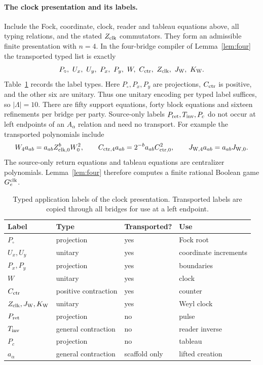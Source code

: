 \paragraph{The clock presentation and its labels.}
Include the Fock, coordinate, clock, reader and tableau equations above, all typing relations, and the stated $Z_{\rm clk}$ commutators. They form an admissible finite presentation with $n=4$. In the four-bridge compiler of Lemma~\ref{lem:four} the transported typed list is exactly
\begin{equation}\label{eq:labelset}
 P_{\circ},\ U_x,\ U_y,\ P_x,\ P_y,\ W,\ C_{\rm ctr},\ Z_{\rm clk},\ J_{\rm W},\ K_{\rm W}.
\end{equation}
Table~\ref{tab:labels} records the label types. Here $P_{\circ},P_x,P_y$ are projections, $C_{\rm ctr}$ is positive, and the other six are unitary. Thus one unitary encoding per typed label suffices, so $|\Lambda|=10$. There are fifty support equations, forty block equations and sixteen refinements per bridge per party. Source-only labels $P_{\rm ret},T_{\rm inv},P_c$ do not occur at left endpoints of an $A_\alpha$ relation and need no transport. For example the transported polynomials include
\[
 W_4a_{ab}=a_{ab}Z_{{\rm clk},0}^bW_0^2,\qquad
 C_{{\rm ctr},4}a_{ab}=2^{-b}a_{ab}C_{{\rm ctr},0}^2,\qquad
 J_{{\rm W},4}a_{ab}=a_{ab}J_{{\rm W},0}.
\]
The source-only return equations and tableau equations are centralizer polynomials. Lemma~\ref{lem:four} therefore computes a finite rational Boolean game $G^{\rm clk}_e$.

\begin{table}[ht]
\centering\small
\begin{tabular}{@{}llll@{}}
\toprule Label & Type & Transported? & Use\\\midrule
$P_{\circ}$ & projection & yes & Fock root\\
$U_x,U_y$ & unitary & yes & coordinate increments\\
$P_x,P_y$ & projection & yes & boundaries\\
$W$ & unitary & yes & clock\\
$C_{\rm ctr}$ & positive contraction & yes & counter\\
$Z_{\rm clk},J_{\rm W},K_{\rm W}$ & unitary & yes & Weyl clock\\
$P_{\rm ret}$ & projection & no & pulse\\
$T_{\rm inv}$ & general contraction & no & reader inverse\\
$P_c$ & projection & no & tableau\\
$a_\alpha$ & general contraction & scaffold only & lifted creation\\
\bottomrule
\end{tabular}
\caption{Typed application labels of the clock presentation. Transported labels are copied through all bridges for use at a left endpoint.}\label{tab:labels}
\end{table}

